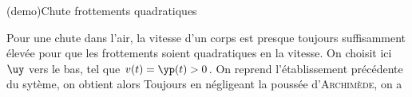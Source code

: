 \documentclass[../../main/main.tex]{subfiles}
\begin{document}
\begin{tcb*}(demo){Chute frottements quadratiques}
	\begin{isd}[righthand ratio=.20]
		Pour une chute dans l'air, la vitesse d'un corps est presque toujours
		suffisamment élevée pour que les frottements soient quadratiques en la
		vitesse.
		\smallbreak
		On choisit ici $\uy$ vers le bas, tel que $v(t) = \yp(t) > 0$. On
		reprend l'établissement précédente du sytème, on obtient alors
		\psw{%
			\[\Fff = -\beta\yp^2(t)\uy\]
		}%
		Toujours en négligeant la poussée d'\textsc{Archimède}, on a
		\psw{%
			\[\dv{v}{t} + \frac{\beta}{m}v^2(t) = g\]
		}%
		\tcblower
		\begin{center}
\end{center}
\end{isd}
\end{tcb*}
\end{document}
